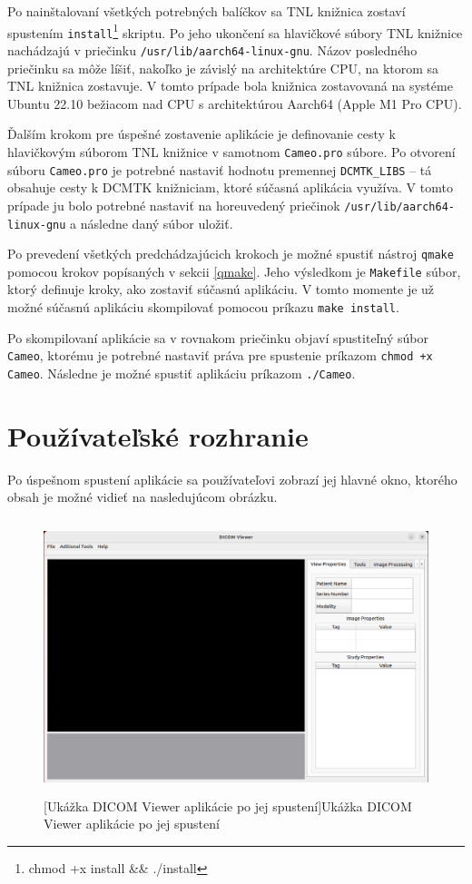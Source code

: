 {Po nainštalovaní všetkých potrebných balíčkov sa TNL knižnica zostaví spustením \texttt{install}\footnote{chmod +x install \&\& ./install} skriptu. Po jeho ukončení sa hlavičkové súbory TNL knižnice nachádzajú v priečinku \texttt{/usr/lib/aarch64-linux-gnu}. Názov posledného priečinku sa môže líšiť, nakoľko je závislý na architektúre CPU, na ktorom sa TNL knižnica zostavuje. V tomto prípade bola knižnica zostavovaná na systéme Ubuntu 22.10 bežiacom nad CPU s architektúrou Aarch64 (Apple M1 Pro CPU).

Ďalším krokom pre úspešné zostavenie aplikácie je definovanie cesty k hlavičkovým súborom TNL knižnice v samotnom \texttt{Cameo.pro} súbore. Po otvorení súboru \texttt{Cameo.pro} je potrebné nastaviť hodnotu premennej \lstinline{DCMTK_LIBS} -- tá obsahuje cesty k DCMTK knižniciam, ktoré súčasná aplikácia využíva. V tomto prípade ju bolo potrebné nastaviť na horeuvedený priečinok \newline \texttt{/usr/lib/aarch64-linux-gnu} a následne daný súbor uložiť.

Po prevedení všetkých predchádzajúcich krokoch je možné spustiť nástroj \texttt{qmake} pomocou krokov popísaných v sekcii \ref{qmake}. Jeho výsledkom je \newline \texttt{Makefile} súbor, ktorý definuje kroky, ako zostaviť súčasnú aplikáciu. V tomto momente je už možné súčasnú aplikáciu skompilovať pomocou príkazu \texttt{make install}.

Po skompilovaní aplikácie sa v rovnakom priečinku objaví spustiteľný súbor \texttt{Cameo}, ktorému je potrebné nastaviť práva pre spustenie príkazom \texttt{chmod +x Cameo}. Následne je možné spustiť aplikáciu príkazom \texttt{./Cameo}. \clearpage

\section {Používateľské rozhranie}\label{old_ui}
Po úspešnom spustení aplikácie sa používateľovi zobrazí jej hlavné okno, ktorého obsah je možné vidieť na nasledujúcom obrázku.
\begin {figure}[ht]
        \centering
        \includegraphics[height=8cm]{media/existing_app/init.png}
        \captionsetup{justification=centering}
        [Ukážka DICOM Viewer aplikácie po jej spustení]{Ukážka DICOM Viewer aplikácie po jej spustení}
\end {figure}

}

